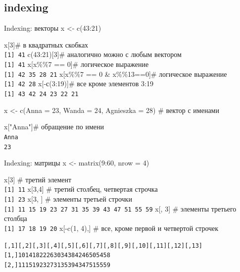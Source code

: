 \subsection{indexing}
\begin{frame}{Indexing: векторы}
x <- c(43:21)
\begin{itemize}
\mytem x[3]\hfill \# в квадратных скобках\\
\footnotesize \verb"[1] 41"\normalsize \hfill
{\color{red!13!blue}{Любители Python! Индексация начинается с 1!}}
\mytem c(43:21)[3]\hfill \# аналогично можно с любым вектором\\
\footnotesize \verb"[1] 41"\normalsize
\mytem x[x\%\%7 == 0]\hfill \# логическое выражение\\
\footnotesize \verb"[1] 42 35 28 21"\normalsize
\mytem x[x\%\%7 == 0 \& x\%\%13==0]\hfill \# логическое выражение\\
\footnotesize \verb"[1] 42 28"\normalsize
\mytem x[-с(3:19)]\hfill \# все кроме элементов 3:19\\
\footnotesize \verb"[1] 43 42 24 23 22 21"\normalsize
\end{itemize}
\vfill
x <- c(Anna = 23, Wanda = 24, Agnieszka  = 28) \hfill \# вектор с именами
\begin{itemize}
\mytem x["Anna"]\hfill \# обращение по имени\\
\footnotesize \verb"Anna"\normalsize\\
\footnotesize \verb"23"\normalsize
\end{itemize}
\end{frame}
\begin{frame}[fragile]{Indexing: матрицы}
x <- matrix(9:60, nrow = 4)
\begin{itemize}
\mytem x[3] \hfill \# третий элемент\\
\footnotesize \verb"[1] 11"\normalsize
\mytem x[3,4]  \hfill \# третий столбец, четвертая строчка\\
\footnotesize \verb"[1] 23"\normalsize
\mytem x[3, ]  \hfill \# элементы третьей строчки\\
\footnotesize \verb"[1] 11 15 19 23 27 31 35 39 43 47 51 55 59"\normalsize
\mytem x[, 3] \hfill \# элементы третьего столбца\\
\footnotesize \verb"[1] 17 18 19 20"\normalsize
\mytem x[-c(1, 4),] \hfill \# все, кроме первой и четвертой строчек\\
\footnotesize
\begin{alltt}
     [,1] [,2] [,3] [,4] [,5] [,6] [,7] [,8] [,9] [,10] [,11] [,12] [,13]
[1,]   10   14   18   22   26   30   34   38   42    46    50    54    58
[2,]   11   15   19   23   27   31   35   39   43    47    51    55    59
\end{alltt}
\normalsize
\end{itemize}
\end{frame}
